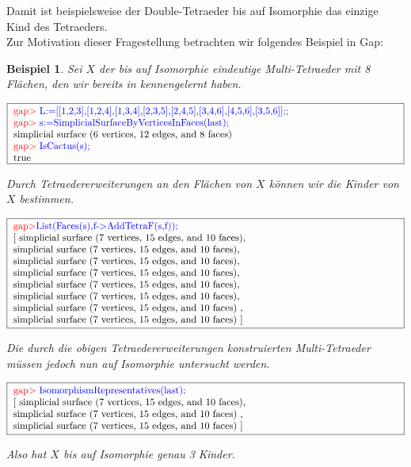 \documentclass[12pt,titlepage,twoside,cleardoublepage]{article}
\theoremstyle{nummermitklammern}
\newtheorem{bsp}[temp]{Beispiel}
\newtheorem{bsp}[zahl]{Beispiel}
\numberwithin{equation}{section}
\begin{document}
Damit ist beispielsweise der Double-Tetraeder bis auf Isomorphie das einzige Kind des Tetraeders. \\
Zur Motivation dieser Fragestellung betrachten wir folgendes Beispiel in Gap:
\begin{bsp}
Sei $X$ der bis auf Isomorphie eindeutige Multi-Tetraeder mit 8 Flächen, den wir bereits in  kennengelernt haben. 
\begin{center}
$\fbox{
\parbox{14cm}{
\textcolor{red}{gap$>$} \textcolor{blue}{L:=[[1,2,3],[1,2,4],[1,3,4],[2,3,5],[2,4,5],[3,4,6],[4,5,6],[3,5,6]];;}\newline
\textcolor{red}{gap$>$} \textcolor{blue}{s:=SimplicialSurfaceByVerticesInFaces(last);}\newline
simplicial surface (6 vertices, 12 edges, and 8 faces)\newline
\textcolor{red}{gap$>$} \textcolor{blue}{IsCactus(s);}\newline
true
}}$
\end{center}
Durch Tetraedererweiterungen an den Flächen von $X$ können wir die Kinder von $X$ bestimmen.
\begin{center}
$\fbox{
\parbox{14cm}{
\textcolor{red}{gap$>$}\textcolor{blue}{ List(Faces(s),f-$>$AddTetraF(s,f));}\newline
[ simplicial surface (7 vertices, 15 edges, and 10 faces),\newline
simplicial surface (7 vertices, 15 edges, and 10 faces),\newline
 simplicial surface (7 vertices, 15 edges, and 10 faces),\newline
 simplicial surface (7 vertices, 15 edges, and 10 faces),\newline
 simplicial surface (7 vertices, 15 edges, and 10 faces),\newline
 simplicial surface (7 vertices, 15 edges, and 10 faces),\newline
  simplicial surface (7 vertices, 15 edges, and 10 faces)
    ,\newline
  simplicial surface (7 vertices, 15 edges, and 10 faces)
 ]
 }}$
 \end{center}
 Die durch die obigen Tetraedererweiterungen konstruierten Multi-Tetraeder müssen jedoch nun auf Isomorphie untersucht werden.
 \begin{center} 
 $\fbox{
\parbox{14cm}{
\textcolor{red}{gap$>$} \textcolor{blue}{IsomorphismRepresentatives(last);}\newline
[ simplicial surface (7 vertices, 15 edges, and 10 faces),\newline
 simplicial surface (7 vertices, 15 edges, and 10 faces)
    ,
    \newline
  simplicial surface (7 vertices, 15 edges, and 10 faces)
 ]
}}$
\end{center}
Also hat $X$ bis auf Isomorphie genau 3 Kinder. 
\end{bsp}
\end{document}
